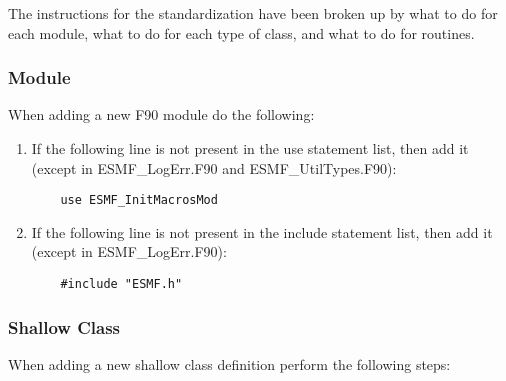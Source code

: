   The instructions for the standardization have been broken 
up by what to do for each module, what to do for each type of class, 
and what to do for routines.

\subsubsection{Module}

When adding a new F90 module do the following:

\begin{enumerate}
\item If the following line is not present in the use statement list, then add 
it (except in ESMF\_LogErr.F90 and ESMF\_UtilTypes.F90):
\begin{verbatim}
    use ESMF_InitMacrosMod 
\end{verbatim}

\item If the following line is not present in the include statement list, then add it (except in ESMF\_LogErr.F90):
\begin{verbatim}
    #include "ESMF.h"
\end{verbatim}
\end{enumerate}


\subsubsection{Shallow Class}

 When adding a new shallow class definition perform the following steps:

